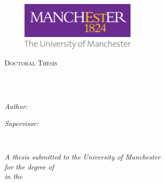\begin{titlepage}
    \begin{center}
    
    \begin{figure}
        \centering
        \includegraphics[width=0.5\textwidth]{Figures/UoM_logo}
    \end{figure}
    
     \vspace*{.01\textheight}
    \textsc{\Large Doctoral Thesis}\\[0.5cm] %
    
    \HRule \\[0.4cm] %
    {\huge \bfseries \textcolor{sectioncolor}{\ttitle}\par}\vspace{0.4cm} %
    \HRule \\[1.5cm] %
     
    \begin{minipage}[t]{0.4\textwidth}
    \begin{flushleft} \large
    \emph{Author:}\\
    \authorname %
    \end{flushleft}
    \end{minipage}
    \begin{minipage}[t]{0.4\textwidth}
    \begin{flushright} \large
    \emph{Supervisor:} \\
    \supname %
    \end{flushright}
    \end{minipage}\\[3cm]
     
    \vfill
    
    \large \textit{A thesis submitted to the University of Manchester\\ for the degree of \degreename}\\[0.3cm] %
    \textit{in the}\\[0.4cm]
    \deptname\\\groupname\\\facname\\[2cm] %
     
    \vfill
    
    {\large {\the\year}}\\[4cm] %
     
    \vfill
    
    \end{center}
    \end{titlepage}